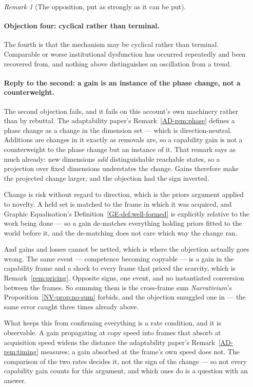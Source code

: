 \documentclass[11pt,a4paper]{article}
\theoremstyle{remark}
\newtheorem{remark}[definition]{Remark}
\begin{document}
\begin{remark}[The opposition, put as strongly as it can be put]
\paragraph{Objection four: cyclical rather than terminal.}
The fourth is that the mechanism may be cyclical rather than terminal. Comparable or worse
institutional dysfunction has occurred repeatedly and been recovered from, and nothing above
distinguishes an oscillation from a trend.

\paragraph{Reply to the second: a gain is an instance of the phase change, not a counterweight.}
The second objection fails, and it fails on this account's own machinery rather than by rebuttal.
The adaptability paper's Remark~\ref{AD-rem:phase} defines a phase change as a change in the dimension set --- which is
direction-neutral. Additions are changes in it exactly as removals are, so a capability gain is not a
counterweight to the phase change but an instance of it. That remark says as much already: new
dimensions \emph{add} distinguishable reachable states, so a projection over fixed dimensions understates
the change. Gains therefore make the projected change larger, and the objection had the sign
inverted.

Change is risk without regard to direction, which is the priors argument applied to novelty. A
held set is matched to the frame in which it was acquired, and Graphic Equalisation's Definition~\ref{GE-def:well-formed}
is explicitly relative to the work being done --- so a gain de-matches everything holding priors fitted to
the world before it, and the de-matching does not care which way the change ran.

And gains and losses cannot be netted, which is where the objection actually goes wrong. The same
event --- competence becoming copyable --- is a gain in the capability frame and a shock to every frame
that priced the scarcity, which is Remark~\ref{rem:pricing}. Opposite signs, one event, and no
instantiated conversion between the frames. So summing them is the cross-frame sum \emph{Narrativium}'s Proposition~\ref{NV-prop:no-sum}
forbids, and the objection smuggled one in --- the same error caught three times already
above.

What keeps this from confirming everything is a rate condition, and it is observable. A gain
propagating at copy speed into frames that absorb at acquisition speed widens the distance
the adaptability paper's Remark~\ref{AD-rem:timing} measures; a gain absorbed at the frame's own speed does not. The
comparison of the two rates decides it, not the sign of the change --- so not every capability gain
counts for this argument, and which ones do is a question with an answer.


\end{remark}
\end{document}
